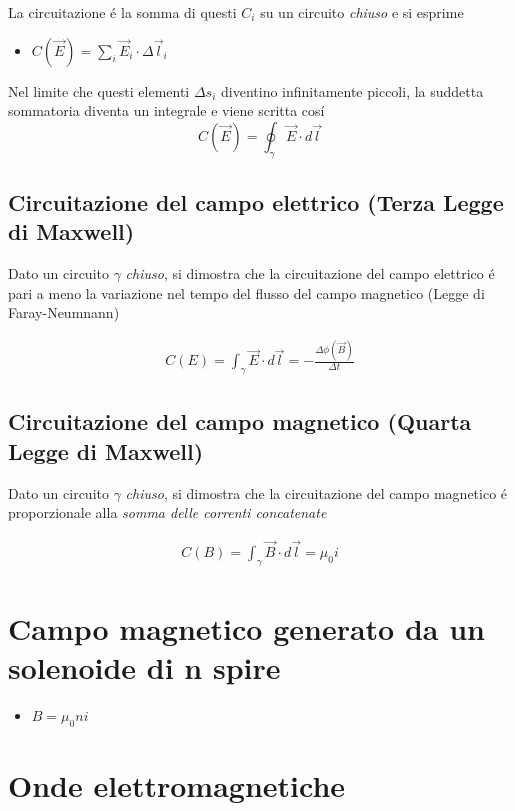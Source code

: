 \documentclass[17pt]{article}
\begin{document}
La circuitazione \'e la somma di questi $C_i$ su un circuito \emph{chiuso} e si esprime
\begin{itemize}
	\item $ C(\vec{E}) = \sum_i  \vec{E}_i\cdot\Delta \vec{l}_i$
\end{itemize}

Nel limite che questi elementi $\Delta s_i$ diventino infinitamente piccoli, la suddetta sommatoria diventa un integrale e viene scritta cos\'i
$$
C(\vec{E}) = \oint_{\gamma} \vec{E}\cdot d\vec{l}
$$


\subsection{Circuitazione del campo elettrico (Terza Legge di Maxwell)}

Dato un circuito $\gamma$ \emph{chiuso}, si dimostra che la circuitazione del campo elettrico \'e pari a meno la variazione nel tempo del flusso del campo magnetico (Legge di Faray-Neumnann)


\begin{eqnarray}
	C(E)= \int_{\gamma}\vec{E}\cdot d\vec{l} = -\frac{\Delta \phi(\vec{B})}{\Delta t}
\end{eqnarray}

\subsection{Circuitazione del campo magnetico (Quarta Legge di Maxwell)}

Dato un circuito $\gamma$ \emph{chiuso}, si dimostra che la circuitazione del campo magnetico \'e proporzionale alla \emph{somma delle correnti concatenate}

\begin{eqnarray}
	C(B)= \int_{\gamma}\vec{B}\cdot d\vec{l} = \mu_0 i
\end{eqnarray}



\section{Campo magnetico generato da un solenoide di n spire}
\begin{itemize}
	\item $B = \mu_0 ni$
\end{itemize}






\section{Onde elettromagnetiche}
\end{document}
